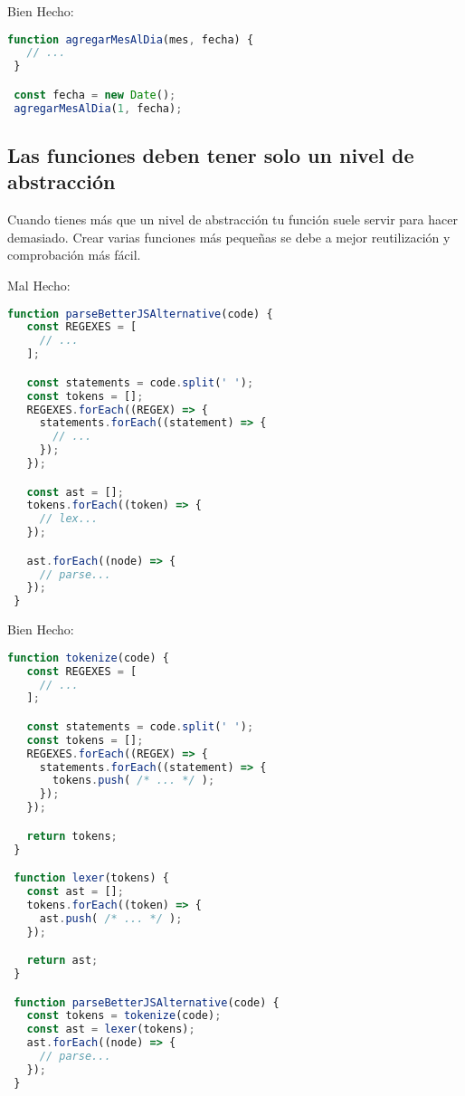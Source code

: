 Bien Hecho:
\begin{lstlisting}[language=TypeScript, style=goodstyle]
 function agregarMesAlDia(mes, fecha) {
   // ...
 }

 const fecha = new Date();
 agregarMesAlDia(1, fecha);
\end{lstlisting}

\newpage

\subsection*{Las funciones deben tener solo un nivel de abstracción}

Cuando tienes más que un nivel de abstracción tu función suele servir para hacer demasiado. Crear varias funciones más pequeñas se debe a mejor reutilización y comprobación más fácil.

Mal Hecho:
\begin{lstlisting}[language=TypeScript, style=badstyle]
 function parseBetterJSAlternative(code) {
   const REGEXES = [
     // ...
   ];

   const statements = code.split(' ');
   const tokens = [];
   REGEXES.forEach((REGEX) => {
     statements.forEach((statement) => {
       // ...
     });
   });

   const ast = [];
   tokens.forEach((token) => {
     // lex...
   });

   ast.forEach((node) => {
     // parse...
   });
 }
\end{lstlisting}
\vspace{0.5cm} %

Bien Hecho:
\begin{lstlisting}[language=TypeScript, style=goodstyle]
 function tokenize(code) {
   const REGEXES = [
     // ...
   ];

   const statements = code.split(' ');
   const tokens = [];
   REGEXES.forEach((REGEX) => {
     statements.forEach((statement) => {
       tokens.push( /* ... */ );
     });
   });

   return tokens;
 }

 function lexer(tokens) {
   const ast = [];
   tokens.forEach((token) => {
     ast.push( /* ... */ );
   });

   return ast;
 }

 function parseBetterJSAlternative(code) {
   const tokens = tokenize(code);
   const ast = lexer(tokens);
   ast.forEach((node) => {
     // parse...
   });
 }
\end{lstlisting}

